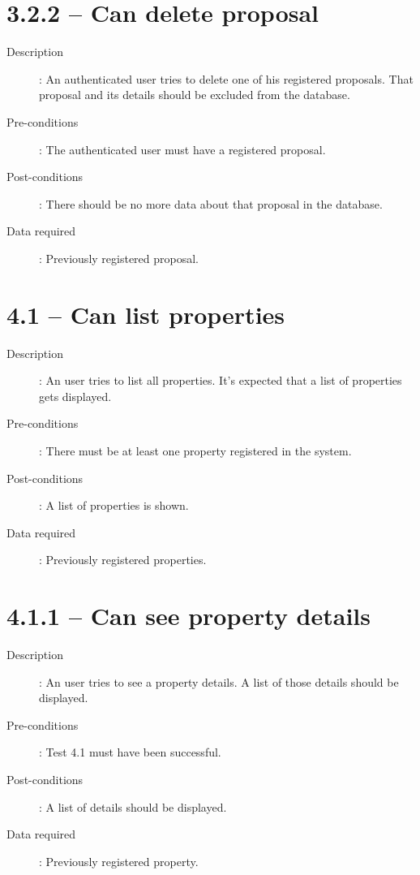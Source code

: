 \section*{3.2.2 – Can delete proposal}

\begin{description}
    \item[Description]: An authenticated user tries to delete one of his registered proposals. That proposal and its details should be excluded from the database.
    \item[Pre-conditions]: The authenticated user must have a registered proposal.
    \item[Post-conditions]: There should be no more data about that proposal in the database.
    \item[Data required]: Previously registered proposal.
\end{description}

\section*{4.1 – Can list properties}
\begin{description}
    \item[Description]: An user tries to list all properties. It’s expected that a list of properties gets displayed.
    \item[Pre-conditions]: There must be at least one property registered in the system.
    \item[Post-conditions]: A list of properties is shown.
    \item[Data required]: Previously registered properties.     
\end{description}

\section*{4.1.1 – Can see property details}

\begin{description}
    \item[Description]: An user tries to see a property details. A list of those details should be displayed.
    \item[Pre-conditions]: Test 4.1 must have been successful.
    \item[Post-conditions]: A list of details should be displayed.
    \item[Data required]: Previously registered property.
\end{description}

